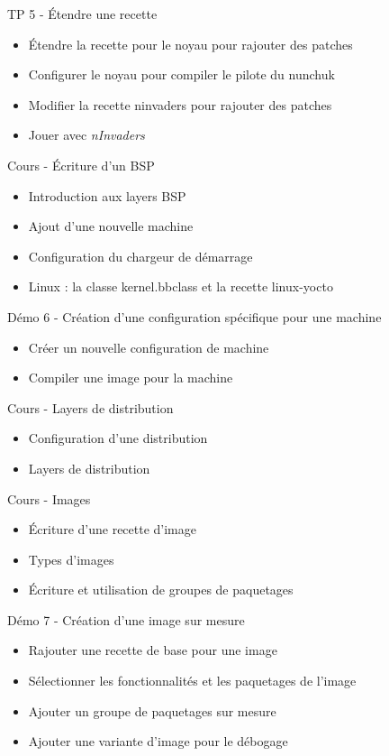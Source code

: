 \documentclass[a4paper,12pt,obeyspaces,spaces,hyphens]{article}
\begin{document}
\feagendaonecolumn
{TP 5 - Étendre une recette}
{
  \begin{itemize}
  \item Étendre la recette pour le noyau pour rajouter des patches
  \item Configurer le noyau pour compiler le pilote du nunchuk
  \item Modifier la recette ninvaders pour rajouter des patches
  \item Jouer avec {\em nInvaders}
  \end{itemize}
}

\feagendatwocolumn
{Cours - Écriture d'un BSP}
{
  \begin{itemize}
  \item Introduction aux layers BSP
  \item Ajout d'une nouvelle machine
  \item Configuration du chargeur de démarrage
  \item Linux : la classe kernel.bbclass et la recette linux-yocto
  \end{itemize}
}
{Démo 6 - Création d'une configuration spécifique pour une machine}
{
  \begin{itemize}
  \item Créer un nouvelle configuration de machine
  \item Compiler une image pour la machine
  \end{itemize}
}

\feagendaonecolumn
{Cours - Layers de distribution}
{
  \begin{itemize}
  \item Configuration d'une distribution
  \item Layers de distribution
  \end{itemize}
}

\feagendatwocolumn
{Cours - Images}
{
  \begin{itemize}
  \item Écriture d'une recette d'image
  \item Types d'images
  \item Écriture et utilisation de groupes de paquetages
  \end{itemize}
}
{Démo 7 - Création d'une image sur mesure}
{
  \begin{itemize}
  \item Rajouter une recette de base pour une image
  \item Sélectionner les fonctionnalités et les paquetages de l'image
  \item Ajouter un groupe de paquetages sur mesure
  \item Ajouter une variante d'image pour le débogage
  \end{itemize}
}
\end{document}
